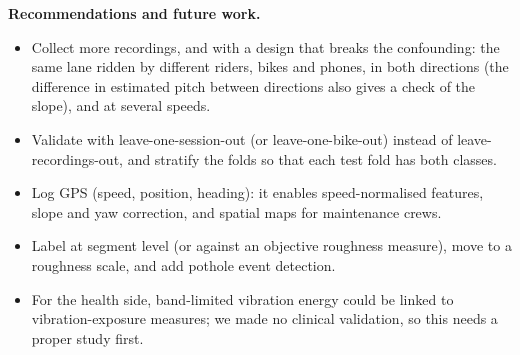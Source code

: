 \documentclass[10pt,a4paper]{article}
\begin{document}
\textbf{Recommendations and future work.}
\begin{itemize}
  \item Collect more recordings, and with a design that breaks the confounding: the same lane ridden by different riders, bikes and phones, in both directions (the difference in estimated pitch between directions also gives a check of the slope), and at several speeds.
  \item Validate with leave-one-session-out (or leave-one-bike-out) instead of leave-recordings-out, and stratify the folds so that each test fold has both classes.
  \item Log GPS (speed, position, heading): it enables speed-normalised features, slope and yaw correction, and spatial maps for maintenance crews.
  \item Label at segment level (or against an objective roughness measure), move to a roughness scale, and add pothole event detection.
  \item For the health side, band-limited vibration energy could be linked to vibration-exposure measures; we made no clinical validation, so this needs a proper study first.
\end{itemize}
\end{document}
